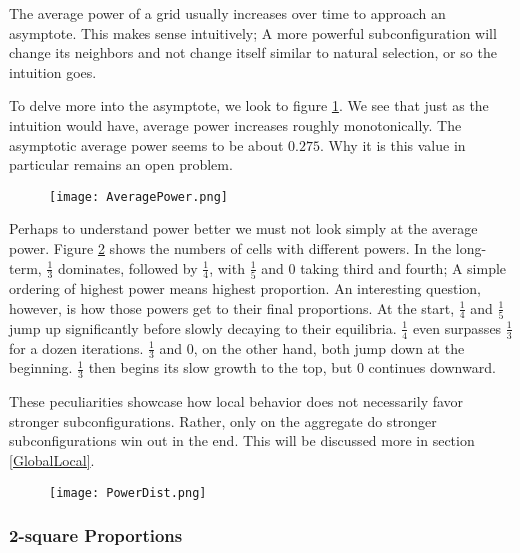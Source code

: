 \documentclass[12pt]{article}
\theoremstyle{definition}
\theoremstyle{remark}
\theoremstyle{remark}
\begin{document}
\par
The average power of a grid usually increases over time to approach an asymptote. This makes sense intuitively; A more powerful subconfiguration will change its neighbors and not change itself similar to natural selection, or so the intuition goes.

\par
To delve more into the asymptote, we look to figure \ref{AveragePower}. We see that just as the intuition would have, average power increases roughly monotonically. The asymptotic average power seems to be about $0.275$. Why it is this value in particular remains an open problem.

\begin{figure}
  \caption{}
  \label{AveragePower}
  \centering
  \texttt{[image: AveragePower.png]}
\end{figure}

\par
Perhaps to understand power better we must not look simply at the average power. Figure \ref{PowerDist} shows the numbers of cells with different powers. In the long-term, $\frac{1}{3}$ dominates, followed by $\frac{1}{4}$, with $\frac{1}{5}$ and $0$ taking third and fourth; A simple ordering of highest power means highest proportion. An interesting question, however, is how those powers get to their final proportions. At the start, $\frac{1}{4}$ and $\frac{1}{5}$ jump up significantly before slowly decaying to their equilibria. $\frac{1}{4}$ even surpasses $\frac{1}{3}$ for a dozen iterations. $\frac{1}{3}$ and $0$, on the other hand, both jump down at the beginning. $\frac{1}{3}$ then begins its slow growth to the top, but $0$ continues downward.

\par
These peculiarities showcase how local behavior does not necessarily favor stronger subconfigurations. Rather, only on the aggregate do stronger subconfigurations win out in the end. This will be discussed more in section \ref{GlobalLocal}.

\begin{figure}
  \caption{}
  \label{PowerDist}
  \centering
  \texttt{[image: PowerDist.png]}
\end{figure}

\subsubsection{2-square Proportions} \label{LongTerm2P}
\end{document}
